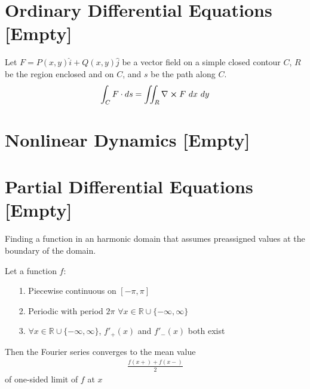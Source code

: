 \documentclass[12pt, english]{book}
\begin{document}
	
	
	
	\part{Ordinary Differential Equations [Empty]} \label{Ordinary Differential Equations Part}
	
	\begin{theorem}
		\label{Green's Theorem - ODE}
		Let \(F = P(x,y) \hat{i} + Q(x,y) \hat{j}\) be a vector field on a simple closed contour \(C\), \(R\) be the region enclosed and on \(C\), and \(s\) be the path along \(C\).
		\begin{align*}
			\int_C F \cdot ds = \iint_R \nabla \cross F \ dx \ dy
		\end{align*}
	\end{theorem}
	
	\part{Nonlinear Dynamics [Empty]} \label{Nonlinear Dynamics Part}
	
	
	\part{Partial Differential Equations [Empty]} \label{Partial Differential Equations Part}
	
	\begin{definition}
		\label{Dirichlet Problem Definition - Partial}
		Finding a function in an harmonic domain that assumes preassigned values at the boundary of the domain.
	\end{definition}
	
	\begin{theorem}
		\label{Fourier Theorem - PDE}
		Let a function \(f\):
		\begin{itemize}
			\item[1.] Piecewise continuous on \([-\pi,\pi]\)
			\item[2.] Periodic with period \(2\pi\) \(\forall x \in \mathbb{R} \cup \{-\infty,\infty\}\)
			\item[3.] \(\forall x \in \mathbb{R} \cup \{-\infty,\infty\}\), \(f'_{+}(x)\) and \(f'_{-}(x)\) both exist 
		\end{itemize}
		Then the Fourier series converges to the mean value
		\begin{align*}
			\frac{f(x+) + f(x-)}{2}
		\end{align*}
		of one-sided limit of \(f\) at \(x\)
	\end{theorem}
	
\end{document}

